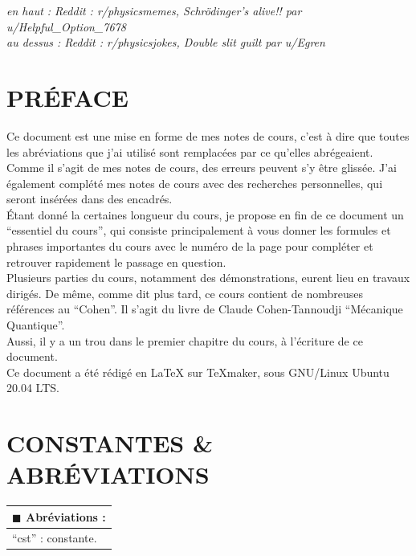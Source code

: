 \documentclass[12pt,a4paper,titlepage]{book}
\begin{document}
\textit{en haut : Reddit : r/physicsmemes, Schrödinger's alive!! par u/Helpful\_{}Option\_{}7678}\\

\textit{au dessus : Reddit : r/physicsjokes, Double slit guilt par u/Egren}
\newpage
\null
\newpage
{}
\tableofcontents
\newpage
\chapter*{PRÉFACE}

Ce document est une mise en forme de mes notes de cours, c'est à dire que toutes les abréviations que j'ai utilisé sont remplacées par ce qu'elles abrégeaient. Comme il s'agit de mes notes de cours, des erreurs peuvent s'y être glissée. J'ai également complété mes notes de cours avec des recherches personnelles, qui seront insérées dans des encadrés.\\

Étant donné la certaines longueur du cours, je propose en fin de ce document un \enquote{essentiel du cours}, qui consiste principalement à vous donner les formules et phrases importantes du cours avec le numéro de la page pour compléter et retrouver rapidement le passage en question.\\

Plusieurs parties du cours, notamment des démonstrations, eurent lieu en travaux dirigés. De même, comme dit plus tard, ce cours contient de nombreuses références au \enquote{Cohen}. Il s'agit du livre de Claude Cohen-Tannoudji \enquote{Mécanique Quantique}.\\

Aussi, il y a un trou dans le premier chapitre du cours, à l'écriture de ce document.\\

Ce document a été rédigé en {\LaTeX} sur TeXmaker, sous GNU/Linux Ubuntu 20.04 LTS.\\

\newpage
\chapter*{CONSTANTES \& ABRÉVIATIONS}

\begin{tabular}{|p{15cm}|}
\hline
$\blacksquare$ Abréviations :\\
\hline
\enquote{cst} : constante.\\
\hline
\end{tabular}\\
\end{document}
